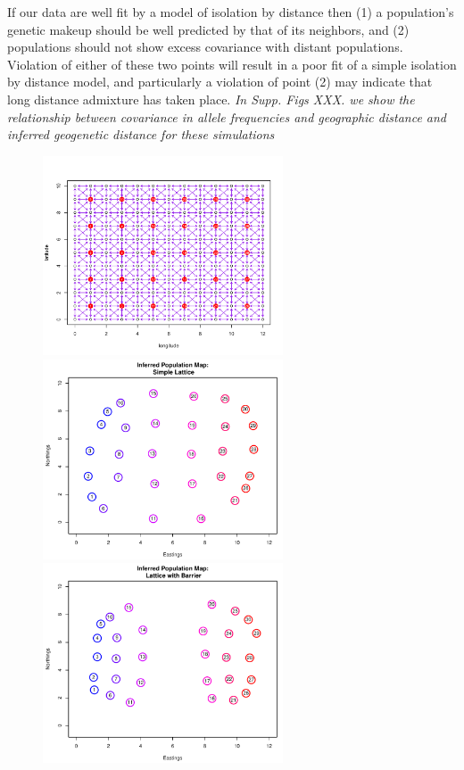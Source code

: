 \documentclass[12pt]{article}
\newcommand{\gc}[1]{{\em \color{blue} #1}}
\begin{document}

If our data are well fit by a model of isolation by distance then (1) a population's genetic makeup should be well predicted by that of its neighbors, and (2) populations should not show excess covariance with distant populations. Violation of either of these two points will result in a poor fit of a simple isolation by distance model, and particularly a violation of point (2) may indicate that long distance admixture has taken place. \gc{In Supp. Figs XXX. we show the relationship between covariance in allele frequencies and geographic distance and inferred geogenetic distance for these simulations}  


\begin{figure}
	\centering
			{\includegraphics[width=2.8in,height=2.33in]{figs/stationary_pops_map.png}}
			{\includegraphics[width=2.8in,height=2.33in]{figs/GeoGenMap_lattice.pdf}}
			{\includegraphics[width=2.8in,height=2.33in]{figs/GeoGenMap_barrier.pdf}}

\end{figure}
\end{document}
